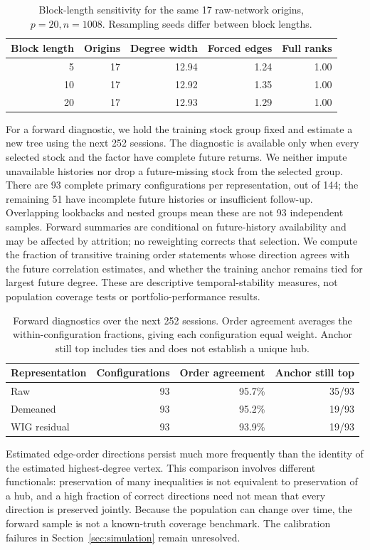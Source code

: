 \begin{table}[htbp]
\caption{Block-length sensitivity for the same 17 raw-network origins, $p=20,n=1008$. Resampling seeds differ between block lengths.}\label{tab:blocks}
\centering\small
\begin{tabular}{rrrrr}
\toprule
Block length & Origins & Degree width & Forced edges & Full ranks \\
\midrule
5 & 17 & 12.94 & 1.24 & 1.00 \\
10 & 17 & 12.92 & 1.35 & 1.00 \\
20 & 17 & 12.93 & 1.29 & 1.00 \\
\bottomrule
\end{tabular}
\end{table}
For a forward diagnostic, we hold the training stock group fixed and estimate a new tree using the next 252 sessions. The diagnostic is available only when every selected stock and the factor have complete future returns. We neither impute unavailable histories nor drop a future-missing stock from the selected group. There are 93 complete primary configurations per representation, out of 144; the remaining 51 have incomplete future histories or insufficient follow-up. Overlapping lookbacks and nested groups mean these are not 93 independent samples. Forward summaries are conditional on future-history availability and may be affected by attrition; no reweighting corrects that selection. We compute the fraction of transitive training order statements whose direction agrees with the future correlation estimates, and whether the training anchor remains tied for largest future degree. These are descriptive temporal-stability measures, not population coverage tests or portfolio-performance results.

\begin{table}[htbp]
\caption{Forward diagnostics over the next 252 sessions. Order agreement averages the within-configuration fractions, giving each configuration equal weight. Anchor still top includes ties and does not establish a unique hub.}\label{tab:forward}
\centering\small
\begin{tabular}{lrrr}
\toprule
Representation & Configurations & Order agreement & Anchor still top \\
\midrule
Raw & 93 & 95.7\% & 35/93 \\
Demeaned & 93 & 95.2\% & 19/93 \\
WIG residual & 93 & 93.9\% & 19/93 \\
\bottomrule
\end{tabular}
\end{table}
Estimated edge-order directions persist much more frequently than the identity of the estimated highest-degree vertex. This comparison involves different functionals: preservation of many inequalities is not equivalent to preservation of a hub, and a high fraction of correct directions need not mean that every direction is preserved jointly. Because the population can change over time, the forward sample is not a known-truth coverage benchmark. The calibration failures in Section~\ref{sec:simulation} remain unresolved.

